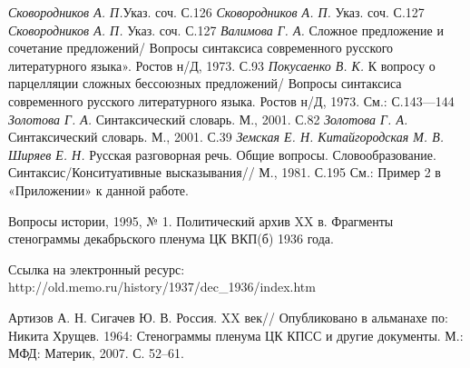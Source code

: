 {\textit{Сковородников А. П.}{Указ. соч. С.126}}
{\textit{{ Сковородников А. П. }}{Указ. соч. С.127}}
{\textit{{ Сковородников А. П. }}{Указ. соч. С.127}}
{{ }\textit{{Валимова Г. А. }}{Сложное предложение и сочетание предложений/ Вопросы синтаксиса современного русского литературного языка». Ростов н/Д, 1973. С.93}}
{{ }\textit{{Покусаенко В. К. }}{К вопросу о парцелляции сложных бессоюзных предложений/ Вопросы синтаксиса современного русского литературного языка. Ростов н/Д, 1973. См.: С.143—144}}
{\textit{ Золотова Г. А.} Синтаксический словарь. М., 2001. С.82}
{\textit{Золотова Г. А.} Синтаксический словарь. М., 2001. С.39}
{\textit{Земская Е. Н. Китайгородская М. В. }\textit{Ширяев Е. Н. }Русская разговорная речь. Общие вопросы. Словообразование. Синтаксис/Конситуативные высказывания// М., 1981. С.195}
{См.: Пример 2 в «Приложении» к данной работе.}
{ Вопросы истории, 1995, № 1. Политический архив XX в. Фрагменты стенограммы декабрьского пленума ЦК ВКП(б) 1936 года.\par Ссылка на электронный ресурс: http://old.memo.ru/history/1937/dec\_1936/index.htm}
{ Артизов А. Н. Сигачев Ю. В. Россия. XX век// Опубликовано в альманахе по: Никита Хрущев. 1964: Стенограммы пленума ЦК КПСС и другие документы. М.: МФД: Материк, 2007. С. 52–61.}